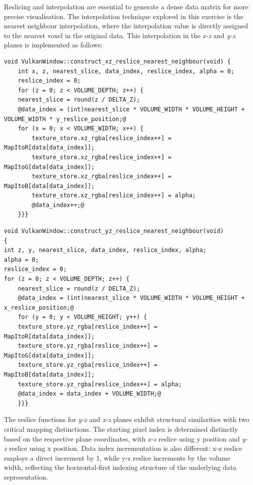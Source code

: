 \documentclass[11pt, twocolumn]{article}
\begin{document}
Reslicing and interpolation are essential to generate a dense data matrix for more precise visualisation. The interpolation technique explored in this exercise is the nearest neighbour interpolation, where the interpolation value is directly assigned to the nearest voxel in the original data. 
This interpolation in the \textit{x-z} and \textit{y-z} planes is implemented as follows:
\begin{lstlisting}[basicstyle=\ttfamily\scriptsize, style=custom, frame=single, caption={\textit{x-z} Reslice Nearest Neighbour}, label={lst:xz_reslice}]
void VulkanWindow::construct_xz_reslice_nearest_neighbour(void) {
    int x, z, nearest_slice, data_index, reslice_index, alpha = 0;
    reslice_index = 0;
    for (z = 0; z < VOLUME_DEPTH; z++) {
    nearest_slice = round(z / DELTA_Z);
    @data_index = (int)nearest_slice * VOLUME_WIDTH * VOLUME_HEIGHT + VOLUME_WIDTH * y_reslice_position;@
    for (x = 0; x < VOLUME_WIDTH; x++) {
        texture_store.xz_rgba[reslice_index++] = MapItoR[data[data_index]];
        texture_store.xz_rgba[reslice_index++] = MapItoG[data[data_index]];
        texture_store.xz_rgba[reslice_index++] = MapItoB[data[data_index]];
        texture_store.xz_rgba[reslice_index++] = alpha;
        @data_index++;@
    }}}
\end{lstlisting}

\begin{lstlisting}[basicstyle=\ttfamily\scriptsize, style=custom, frame=single, caption={\textit{y-z} Reslice Nearest Neighbour}, label={lst:yz_reslice}]
void VulkanWindow::construct_yz_reslice_nearest_neighbour(void)
{
int z, y, nearest_slice, data_index, reslice_index, alpha;
alpha = 0;
reslice_index = 0;
for (z = 0; z < VOLUME_DEPTH; z++) {
    nearest_slice = round(z / DELTA_Z);
    @data_index = (int)nearest_slice * VOLUME_WIDTH * VOLUME_HEIGHT + x_reslice_position;@
    for (y = 0; y < VOLUME_HEIGHT; y++) {
    texture_store.yz_rgba[reslice_index++] = MapItoR[data[data_index]];
    texture_store.yz_rgba[reslice_index++] = MapItoG[data[data_index]];
    texture_store.yz_rgba[reslice_index++] = MapItoB[data[data_index]];
    texture_store.yz_rgba[reslice_index++] = alpha;
    @data_index = data_index + VOLUME_WIDTH;@
    }}}
\end{lstlisting}
The reslice functions for \textit{y-z} and \textit{x-z} planes exhibit structural similarities with two critical mapping distinctions. 
The starting pixel index is determined distinctly based on the respective plane coordinates, with \textit{x-z} reslice using y position and \textit{y-z} reslice using x position. 
Data index incrementation is also different: x-z reslice employs a direct increment by 1, while y-z reslice increments by the volume width, reflecting the horizontal-first indexing structure of the underlying data representation.
\end{document}
